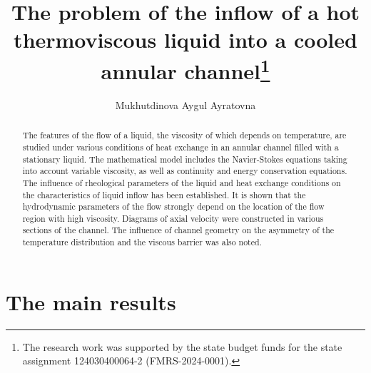\documentclass[12pt]{llncs}
\begin{document}
\fi
%
\title{The problem of the inflow of a hot thermoviscous liquid into a cooled annular channel\thanks{The research work was supported by the state budget funds for the state assignment 124030400064-2 (FMRS-2024-0001).}}

\author{Mukhutdinova Aygul Ayratovna
}

\maketitle

\begin{abstract}
The features of the flow of a liquid, the viscosity of which depends on temperature, are studied under various conditions of heat exchange in an annular channel filled with a stationary liquid. The mathematical model includes the Navier-Stokes equations taking into account variable viscosity, as well as continuity and energy conservation equations. The influence of rheological parameters of the liquid and heat exchange conditions on the characteristics of liquid inflow has been established. It is shown that the hydrodynamic parameters of the flow strongly depend on the location of the flow region with high viscosity. Diagrams of axial velocity were constructed in various sections of the channel. The influence of channel geometry on the asymmetry of the temperature distribution and the viscous barrier was also noted.

\end{abstract}

\section{The main results}
\end{document}
